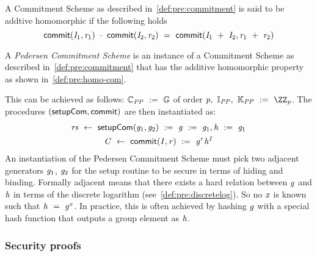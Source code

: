 \begin{definition}\label{def:pre:homo-com}
    A Commitment Scheme as described in~\cref{def:pre:commitment} is said to be addtive homomorphic if the following holds
    \[ \mathsf{commit}(\mathit{I}_1, \mathit{r}_1) ~\cdot~ \mathsf{commit}(\mathit{I}_2, \mathit{r}_2) ~=~ \mathsf{commit}(\mathit{I}_1 ~+~ \mathit{I}_2, \mathit{r}_1 ~+~ \mathit{r}_2) \]
\end{definition}



\begin{definition}\label{def:pre:pedersen}
    A \emph{Pedersen Commitment Scheme} is an instance of a Commitment Scheme as described in~\cref{def:pre:commitment} that has the additive homomorphic property as shown in~\cref{def:pre:homo-com}.

This can be achieved as follows:
    $\mathbb{C}_{\mathit{PP}} ~:=~ \mathbb{G}$ of order $\varPrime \opSeperate \varInputSpace_{\varPublicParam} \opSeperate \varRandSpace_{\varPublicParam} \opAssign \cnstIntegersPrime{\varPrime}$.
    The procedures $(\mathsf{setupCom}, \mathsf{commit})$ are then instantiated as:
    \begin{gather*}
        \mathit{rs} ~\leftarrow~ \mathsf{setupCom} (\mathit{g}_1,\mathit{g}_2) ~:=~ \mathit{g} ~:=~ \mathit{g}_1, \mathit{h} ~:=~ \mathit{g}_1  \\
        \mathit{C} ~\leftarrow~ \mathsf{commit}(\mathit{I}, \mathit{r}) ~:=~ \mathit{g}^{\mathit{r}} \mathit{h}^{\mathit{I}}\\
    \end{gather*}
    An instantiation of the Pedersen Commitment Scheme must pick two adjacent generators $\mathit{g}_1$, $\mathit{g}_2$ for the setup routine to be secure in terms of hiding and binding.
    Formally adjacent means that there exists a hard relation between $\mathit{g}$ and $\mathit{h}$ in terms of the discrete logarithm (see~\cref{def:pre:discretelog}).
So no $\mathit{x}$ is known such that $\mathit{h} ~=~ \mathit{g}^{x}$.
    In practice, this is often achieved by hashing $\mathit{g}$ with a special hash function that outputs a group element as $\mathit{h}$.

\end{definition}

\subsubsection{Security proofs}

